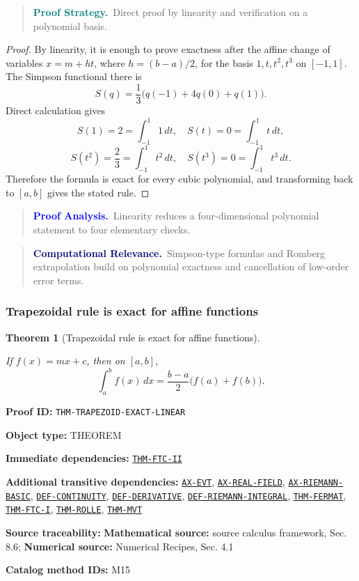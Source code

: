 \documentclass[10pt]{article}
\newcommand{\pidraw}[1]{\begingroup\urlstyle{tt}\nolinkurl{#1}\endgroup}
\newcommand{\pidref}[1]{\hyperref[prf:#1]{\pidraw{#1}}}
\newtheorem{theorem}{Theorem}[section]
\theoremstyle{definition}
\theoremstyle{remark}
\newenvironment{proofstrategy}
{\begin{quote}\small\noindent\textbf{\textcolor{teal}{Proof Strategy.}}\ }
{\end{quote}}
\newenvironment{proofanalysis}
{\begin{quote}\small\noindent\textbf{\textcolor{blue}{Proof Analysis.}}\ }
{\end{quote}}
\newenvironment{computationalrelevance}
{\begin{quote}\small\noindent\textbf{\textcolor{navy}{Computational Relevance.}}\ }
{\end{quote}}
\newcommand{\meta}[2]{\noindent\textbf{#1:} #2\par}
\begin{document}
\begin{proofstrategy}Direct proof by linearity and verification on a polynomial basis.\end{proofstrategy}

\begin{proof}

By linearity, it is enough to prove exactness after the affine change of variables
$x=m+ht$, where $h=(b-a)/2$, for the basis $1,t,t^2,t^3$ on $[-1,1]$.
The Simpson functional there is
\[
S(q)=\frac13\bigl(q(-1)+4q(0)+q(1)\bigr).
\]
Direct calculation gives
\[
S(1)=2=\int_{-1}^1 1\,dt,\quad
S(t)=0=\int_{-1}^1 t\,dt,
\]
\[
S(t^2)=\frac23=\int_{-1}^1 t^2\,dt,\quad
S(t^3)=0=\int_{-1}^1 t^3\,dt.
\]
Therefore the formula is exact for every cubic polynomial, and transforming back
to $[a,b]$ gives the stated rule.

\end{proof}

\begin{proofanalysis}Linearity reduces a four-dimensional polynomial statement to four elementary checks.\end{proofanalysis}

\begin{computationalrelevance}Simpson-type formulas and Romberg extrapolation build on polynomial exactness and cancellation of low-order error terms.\end{computationalrelevance}

\subsubsection{Trapezoidal rule is exact for affine functions}

\begin{theorem}[Trapezoidal rule is exact for affine functions]\label{prf:THM-TRAPEZOID-EXACT-LINEAR}

If $f(x)=mx+c$, then on $[a,b]$,
\[
\int_a^b f(x)\,dx
=
\frac{b-a}{2}\bigl(f(a)+f(b)\bigr).
\]

\end{theorem}

\meta{Proof ID}{\pidraw{THM-TRAPEZOID-EXACT-LINEAR}}
\meta{Object type}{THEOREM}
\meta{Immediate dependencies}{\pidref{THM-FTC-II}}
\meta{Additional transitive dependencies}{\pidref{AX-EVT}, \pidref{AX-REAL-FIELD}, \pidref{AX-RIEMANN-BASIC}, \pidref{DEF-CONTINUITY}, \pidref{DEF-DERIVATIVE}, \pidref{DEF-RIEMANN-INTEGRAL}, \pidref{THM-FERMAT}, \pidref{THM-FTC-I}, \pidref{THM-ROLLE}, \pidref{THM-MVT}}
\meta{Source traceability}{\textbf{Mathematical source:} source calculus framework, Sec. 8.6; \textbf{Numerical source:} Numerical Recipes, Sec. 4.1}
\meta{Catalog method IDs}{M15}
\end{document}
